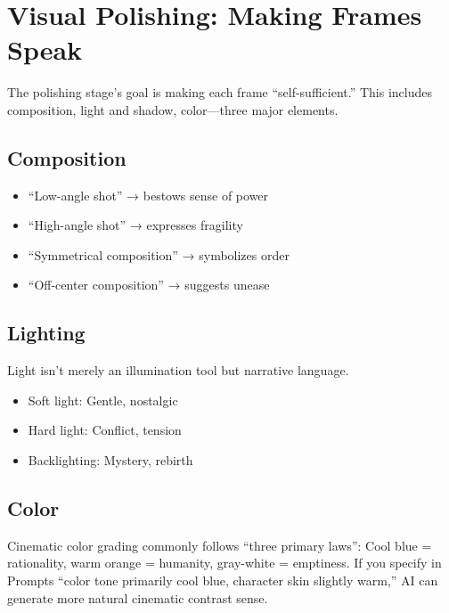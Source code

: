 \section{Visual Polishing: Making Frames Speak}
\label{sec:visual-polishing}

The polishing stage's goal is making each frame ``self-sufficient.'' This includes composition, light and shadow, color—three major elements.

\subsection{Composition}

\begin{itemize}
\item ``Low-angle shot'' → bestows sense of power
\item ``High-angle shot'' → expresses fragility
\item ``Symmetrical composition'' → symbolizes order
\item ``Off-center composition'' → suggests unease
\end{itemize}

\subsection{Lighting}

Light isn't merely an illumination tool but narrative language.

\begin{itemize}
\item Soft light: Gentle, nostalgic
\item Hard light: Conflict, tension
\item Backlighting: Mystery, rebirth
\end{itemize}

\subsection{Color}

Cinematic color grading commonly follows ``three primary laws'': Cool blue = rationality, warm orange = humanity, gray-white = emptiness. If you specify in Prompts ``color tone primarily cool blue, character skin slightly warm,'' AI can generate more natural cinematic contrast sense.

